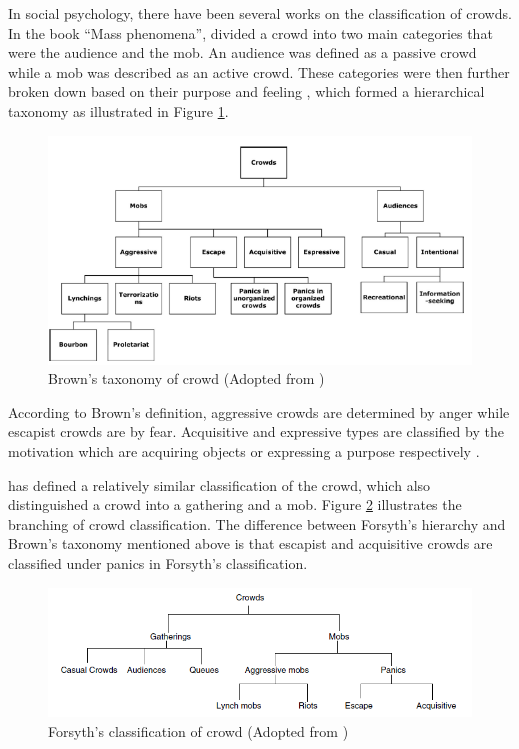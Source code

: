 In social psychology, there have been several works on the classification of crowds. In the book ``Mass phenomena'', \textcite{Brown1954} divided a crowd into two main categories that were the audience and the mob. An audience was defined as a passive crowd while a mob was described as an active crowd. These categories were then further broken down based on their purpose and feeling \parencite{Pelechano2008}, which formed a hierarchical taxonomy as illustrated in Figure \ref{fig:brownCrowdType}.

\begin{figure}[!htbp] 
	\centering    
	\includegraphics[width=1.0\textwidth]{BrownCrowdType}
	\caption{Brown's taxonomy of crowd (Adopted from \textcite{Pelechano2008})}
	\label{fig:brownCrowdType}
\end{figure}


According to Brown’s definition, aggressive crowds are determined by anger while escapist crowds are by fear. Acquisitive and expressive types are classified by the motivation which are acquiring objects or expressing a purpose respectively \parencite{Durupinar2010}.

\textcite{Forsyth2009} has defined a relatively similar classification of the crowd, which also distinguished a crowd into a gathering and a mob. Figure \ref{fig:forsythCrowdType} illustrates the branching of crowd classification. The difference between Forsyth’s hierarchy and Brown’s taxonomy mentioned above is that escapist and acquisitive crowds are classified under panics in Forsyth's classification. 

\begin{figure}[!htbp]
	\centering    
	\includegraphics[width=1.0\textwidth]{ForsythCrowdType}
	\caption{Forsyth's classification of crowd (Adopted from \textcite{klupfel2005models})}
	\label{fig:forsythCrowdType}
\end{figure}

